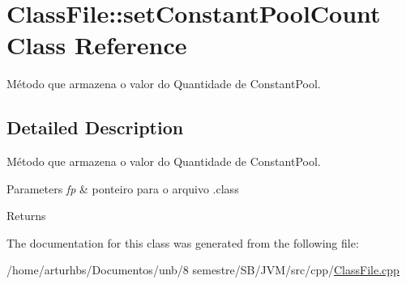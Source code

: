 \hypertarget{classClassFile_1_1setConstantPoolCount}{}\section{Class\+File\+:\+:set\+Constant\+Pool\+Count Class Reference}
\label{classClassFile_1_1setConstantPoolCount}


Método que armazena o valor do Quantidade de Constant\+Pool.  




\subsection{Detailed Description}
Método que armazena o valor do Quantidade de Constant\+Pool. 


\begin{DoxyParams}{Parameters}
{\em fp} & ponteiro para o arquivo .class \\
\hline
\end{DoxyParams}
\begin{DoxyReturn}{Returns}

\end{DoxyReturn}


The documentation for this class was generated from the following file\+:\begin{DoxyCompactItemize}
\item 
/home/arturhbs/\+Documentos/unb/8 semestre/\+S\+B/\+J\+V\+M/src/cpp/\hyperlink{ClassFile_8cpp}{Class\+File.\+cpp}\end{DoxyCompactItemize}
